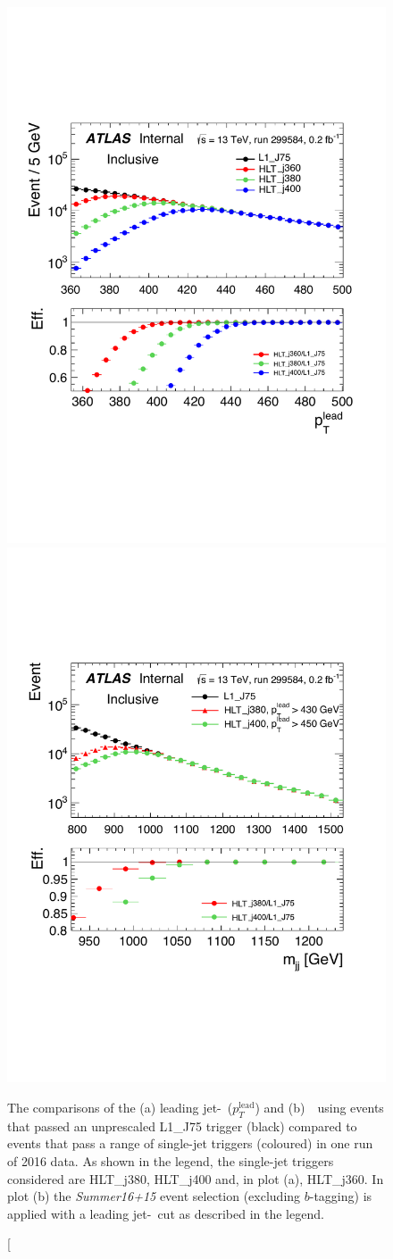 \begin{figure}[!ht]
  \begin{center}
    \captionsetup[subfigure]{aboveskip=0pt,justification=centering}
     {\includegraphics[width=0.45\linewidth, angle=0]{figs/Dibjet/ICHEP/evt-jet_pt.pdf}}
    \subcaptionbox{\mjj}                   {\includegraphics[width=0.44\linewidth, angle=0]{figs/Dibjet/ICHEP/evt-mjj.pdf}}
  \end{center}
  \caption[The comparisons of the (a) leading jet-\pT~($p_T^{\text{lead}}$) and (b)~\mjj~using events that passed an
            unprescaled L1\_J75 trigger (black) compared to events that pass a range of single-jet triggers (coloured) in one run of 2016 data.
            As shown in the legend, the single-jet triggers considered are HLT\_j380, HLT\_j400 and, in plot (a), HLT\_j360.
            In plot (b) the \textit{Summer16+15} event selection (excluding $b$-tagging) is applied with a leading jet-\pT~cut as described in the legend.

\end{figure}

